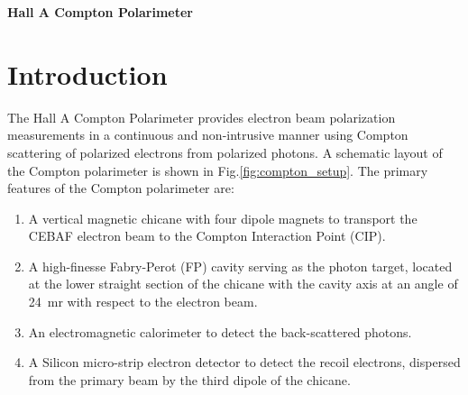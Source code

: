 \label{sec:compton}

\vspace{40pt}
\begin{center}
{\bf\LARGE Hall A Compton Polarimeter}
\end{center}
\vspace{40pt}
\newcommand{\dis}{\displaystyle}
\newcommand{\nn}{\nonumber}
\newcommand{\aexp}{A_{exp}}
\newcommand{\araw}{A_{raw}}
\newcommand{\ath}{A_{{th}}}
\newcommand{\ac}{A_{{c}}}
\newcommand{\af}{A_{{F}}}
\newcommand{\pe}{P_{{e}}}
\newcommand{\pg}{P_{\gamma}}
\newcommand{\np}{N^{+}}
\newcommand{\nm}{N^{-}}
\newcommand{\kp}{k^{\prime}}
\newcommand{\krs}{k^{\prime s}_{r}}
\newcommand{\sigrs}{\sigma^{s}_{r}}
\newcommand{\sigc}{\sigma_{c}}
\newcommand{\kmax}{k^{\prime}_{max}}
\newcommand{\wer}{\omega_R}
\newcommand{\wel}{\omega_L}

\section {Introduction}
\label{sec:compton_introduction}
The Hall A Compton
Polarimeter provides  electron beam polarization measurements in a continuous and non-intrusive manner
using  Compton scattering of polarized electrons from polarized photons. A schematic layout of the
Compton polarimeter is shown in Fig.\ref{fig:compton_setup}. The primary features of the Compton polarimeter are:
\begin{enumerate}
\item A vertical magnetic chicane with  four dipole magnets to transport  the CEBAF electron beam to the Compton Interaction Point (CIP).
\item A high-finesse Fabry-Perot (FP) cavity serving as the photon target, located at the lower straight section of the chicane with the cavity axis at  an angle of 24~mr with respect to  the electron beam.  
\item An electromagnetic calorimeter to detect the  back-scattered photons.
\item A Silicon micro-strip electron detector to detect the recoil electrons, dispersed  from the 
primary beam by the third dipole of the chicane.
\end{enumerate}

